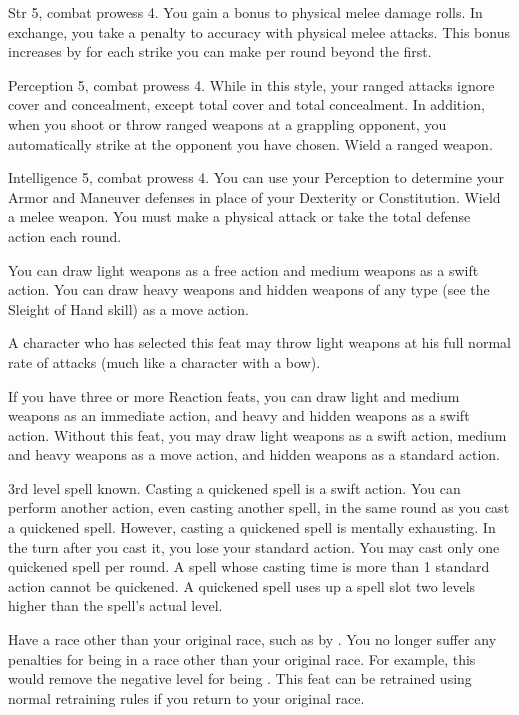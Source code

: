 \featpres Str 5, combat prowess 4.
\featben You gain a  bonus to physical melee damage rolls.
In exchange, you take a  penalty to accuracy with physical melee attacks.
This bonus increases by  for each strike you can make per round beyond the first.

\featpres Perception 5, combat prowess 4.
\featben While in this style, your ranged attacks ignore cover and concealment, except total cover and total concealment.
In addition, when you shoot or throw ranged weapons at a grappling opponent, you automatically strike at the opponent you have chosen.
\stylereq Wield a ranged weapon.

\featpres Intelligence 5, combat prowess 4.
\featben You can use your Perception to determine your Armor and Maneuver defenses in place of your Dexterity or Constitution.
\stylereq Wield a melee weapon.
You must make a physical attack or take the total defense action each round.

\featben You can draw light weapons as a free action and medium weapons as a swift action.
You can draw heavy weapons and hidden weapons of any type (see the Sleight of Hand skill) as a move action.
\par A character who has selected this feat may throw light weapons at his full normal rate of attacks (much like a character with a bow).

If you have three or more Reaction feats, you can draw light and medium weapons as an immediate action, and heavy and hidden weapons as a swift action.
Without this feat, you may draw light weapons as a swift action, medium and heavy weapons as a move action, and hidden weapons as a standard action.

\label{Quicken Spell}
\featpre 3rd level spell known.
\featben Casting a quickened spell is a swift action.
You can perform another action, even casting another spell, in the same round as you cast a quickened spell.
However, casting a quickened spell is mentally exhausting.
In the turn after you cast it, you lose your standard action.
You may cast only one quickened spell per round.
A spell whose casting time is more than 1 standard action cannot be quickened.
A quickened spell uses up a spell slot two levels higher than the spell's actual level.

\label{Racial Acclimation}
\featpre Have a race other than your original race, such as by .
\featben You no longer suffer any penalties for being in a race other than your original race.
For example, this would remove the negative level for being .
This feat can be retrained using normal retraining rules if you return to your original race.

